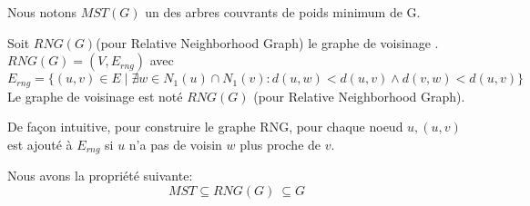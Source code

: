 \begin{mynot}
Nous notons $MST(G)$ un des arbres couvrants de poids minimum de G.
\end{mynot}
\begin{mydef}
Soit $RNG(G)$(pour Relative Neighborhood Graph) le graphe de voisinage .
 $RNG(G)=(V,E_{rng})$ avec $$E_{rng}=\{ (u,v)\in E \mid \nexists w\in N_1(u)\cap N_1(v): d(u,w)<d(u,v) \wedge d(v,w)<d(u,v)  \}$$
Le graphe de voisinage est noté $RNG(G)$ (pour Relative Neighborhood Graph).
\end{mydef}
\begin{myrmq}
 De façon intuitive, pour construire le graphe RNG, pour chaque noeud $u,(u,v)$ est ajouté à $E_{rng}$ si $u$ n'a pas de voisin $w$ plus proche de $v$.
 \end{myrmq}
\begin{myprop}
Nous avons la propriété suivante: $$  MST\subseteq RNG(G)\ \subseteq G$$
\end{myprop}

